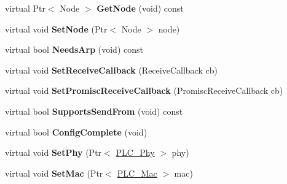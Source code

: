 \begin{DoxyCompactItemize}
\item 
\hypertarget{classns3_1_1PLC__NetDevice_ad1538d05274eea9f4fd0585673396641}{virtual \-Ptr$<$ \-Node $>$ {\bfseries \-Get\-Node} (void) const }\label{classns3_1_1PLC__NetDevice_ad1538d05274eea9f4fd0585673396641}

\item 
\hypertarget{classns3_1_1PLC__NetDevice_a3a774052a0e0d9c98d08728ecc88ae2f}{virtual void {\bfseries \-Set\-Node} (\-Ptr$<$ \-Node $>$ node)}\label{classns3_1_1PLC__NetDevice_a3a774052a0e0d9c98d08728ecc88ae2f}

\item 
\hypertarget{classns3_1_1PLC__NetDevice_a850ca983ecbef1b8ae72dff28fc37442}{virtual bool {\bfseries \-Needs\-Arp} (void) const }\label{classns3_1_1PLC__NetDevice_a850ca983ecbef1b8ae72dff28fc37442}

\item 
\hypertarget{classns3_1_1PLC__NetDevice_a81c473d1d27059a399268e92899d7705}{virtual void {\bfseries \-Set\-Receive\-Callback} (\-Receive\-Callback cb)}\label{classns3_1_1PLC__NetDevice_a81c473d1d27059a399268e92899d7705}

\item 
\hypertarget{classns3_1_1PLC__NetDevice_a98e383b6ccbcc10a092b7667931d3e73}{virtual void {\bfseries \-Set\-Promisc\-Receive\-Callback} (\-Promisc\-Receive\-Callback cb)}\label{classns3_1_1PLC__NetDevice_a98e383b6ccbcc10a092b7667931d3e73}

\item 
\hypertarget{classns3_1_1PLC__NetDevice_a4a223518e776c4d4285246a6f3590834}{virtual bool {\bfseries \-Supports\-Send\-From} (void) const }\label{classns3_1_1PLC__NetDevice_a4a223518e776c4d4285246a6f3590834}

\item 
\hypertarget{classns3_1_1PLC__NetDevice_a77d7296092861fb3c00db750cb2dc3ea}{virtual bool {\bfseries \-Config\-Complete} (void)}\label{classns3_1_1PLC__NetDevice_a77d7296092861fb3c00db750cb2dc3ea}

\item 
\hypertarget{classns3_1_1PLC__NetDevice_a0a4415d87eb58f2e5eae6e440ae98cee}{virtual void {\bfseries \-Set\-Phy} (\-Ptr$<$ \hyperlink{classns3_1_1PLC__Phy}{\-P\-L\-C\-\_\-\-Phy} $>$ phy)}\label{classns3_1_1PLC__NetDevice_a0a4415d87eb58f2e5eae6e440ae98cee}

\item 
\hypertarget{classns3_1_1PLC__NetDevice_aa340827436bde7bdb4908266f7d00a33}{virtual void {\bfseries \-Set\-Mac} (\-Ptr$<$ \hyperlink{classns3_1_1PLC__Mac}{\-P\-L\-C\-\_\-\-Mac} $>$ mac)}\label{classns3_1_1PLC__NetDevice_aa340827436bde7bdb4908266f7d00a33}


\end{DoxyCompactItemize}
